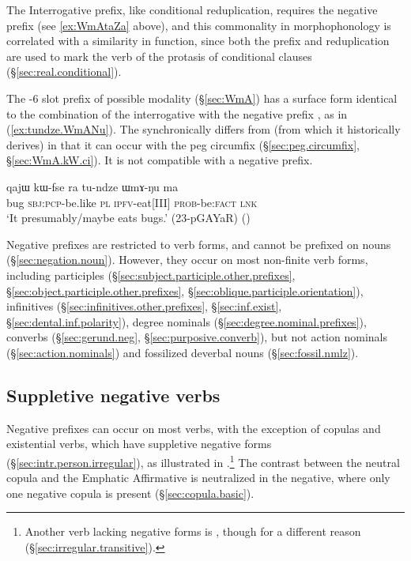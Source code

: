The Interrogative  prefix, like conditional reduplication, requires the  negative prefix (see \ref{ex:WmAtaZa} above), and this commonality in morphophonology is correlated with a similarity in function, since both the prefix  and reduplication are used to mark the verb of the protasis of conditional clauses (§\ref{sec:real.conditional}).


The -6 slot  prefix of possible modality (§\ref{sec:WmA}) has a surface form identical to the combination of the interrogative  with the negative prefix , as in (\ref{ex:tundze.WmANu}). The  synchronically differs from  (from which it historically derives) in that it can occur with the peg circumfix (§\ref{sec:peg.circumfix}, §\ref{sec:WmA.kW.ci}). It is not compatible with a negative prefix.

\begin{exe}
	\ex \label{ex:tundze.WmANu}
	\gll  qajɯ kɯ-fse ra tu-ndze ɯmɤ-ŋu ma \\
	bug \textsc{sbj}:\textsc{pcp}-be.like \textsc{pl} \textsc{ipfv}-eat[III] \textsc{prob}-be:\textsc{fact} \textsc{lnk} \\
	\glt `It presumably/maybe eats bugs.' (23-pGAYaR) ()
\end{exe}

Negative prefixes are restricted to verb forms, and cannot be prefixed on nouns (§\ref{sec:negation.noun}).  However, they occur on most non-finite verb forms, including participles (§\ref{sec:subject.participle.other.prefixes}, §\ref{sec:object.participle.other.prefixes}, §\ref{sec:oblique.participle.orientation}), infinitives (§\ref{sec:infinitives.other.prefixes}, §\ref{sec:inf.exist}, §\ref{sec:dental.inf.polarity}), degree nominals (§\ref{sec:degree.nominal.prefixes}), converbs (§\ref{sec:gerund.neg}, §\ref{sec:purposive.converb}), but not action nominals (§\ref{sec:action.nominals}) and fossilized deverbal nouns (§\ref{sec:fossil.nmlz}).

\subsection{Suppletive negative verbs} \label{sec:suppletive.negative}
Negative prefixes can occur on most verbs, with the exception of copulas and existential verbs, which have suppletive negative forms (§\ref{sec:intr.person.irregular}), as illustrated in .\footnote{Another verb lacking negative forms is  , though for a different reason (§\ref{sec:irregular.transitive}). } The contrast between the neutral copula  and the Emphatic Affirmative  is neutralized in the negative, where only one negative copula  is present (§\ref{sec:copula.basic}).

